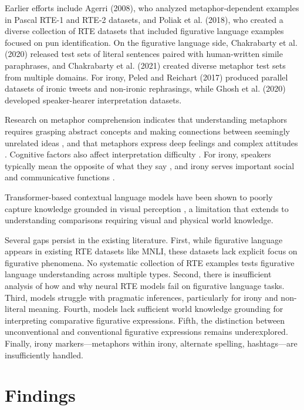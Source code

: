 \documentclass[12pt]{article}
\begin{document}
Earlier efforts include Agerri (2008), who analyzed metaphor-dependent examples in Pascal RTE-1 and RTE-2 datasets, and Poliak et al. (2018), who created a diverse collection of RTE datasets that included figurative language examples focused on pun identification. On the figurative language side, Chakrabarty et al. (2020) released test sets of literal sentences paired with human-written simile paraphrases, and Chakrabarty et al. (2021) created diverse metaphor test sets from multiple domains. For irony, Peled and Reichart (2017) produced parallel datasets of ironic tweets and non-ironic rephrasings, while Ghosh et al. (2020) developed speaker-hearer interpretation datasets.

Research on metaphor comprehension indicates that understanding metaphors requires grasping abstract concepts and making connections between seemingly unrelated ideas \cite{gutierrez2016, mohammad2016}, and that metaphors express deep feelings and complex attitudes \cite{veale2016}. Cognitive factors also affect interpretation difficulty \cite{kintsch2002, glucksberg1998}. For irony, speakers typically mean the opposite of what they say \cite{sperber1981, dews2007}, and irony serves important social and communicative functions \cite{jorgensen1996}.

Transformer-based contextual language models have been shown to poorly capture knowledge grounded in visual perception \cite{weir2020}, a limitation that extends to understanding comparisons requiring visual and physical world knowledge.

Several gaps persist in the existing literature. First, while figurative language appears in existing RTE datasets like MNLI, these datasets lack explicit focus on figurative phenomena. No systematic collection of RTE examples tests figurative language understanding across multiple types. Second, there is insufficient analysis of how and why neural RTE models fail on figurative language tasks. Third, models struggle with pragmatic inferences, particularly for irony and non-literal meaning. Fourth, models lack sufficient world knowledge grounding for interpreting comparative figurative expressions. Fifth, the distinction between unconventional and conventional figurative expressions remains underexplored. Finally, irony markers---metaphors within irony, alternate spelling, hashtags---are insufficiently handled.

\section{Findings}
\end{document}
